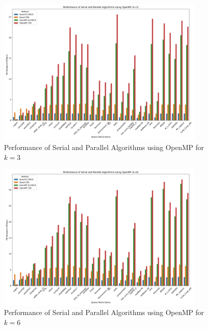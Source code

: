 \documentclass[12pt,oneside]{book} %
\begin{document}
\begin{figure}[H]
    \centering
    \includegraphics[width=0.9\textwidth]{../results/images/openMP_Performance_k3.png}
    \caption{Performance of Serial and Parallel Algorithms using OpenMP for $k=3$}
    \label{fig:openmp-performance-k3}
\end{figure}

\begin{figure}[H]
    \centering
    \includegraphics[width=0.9\textwidth]{../results/images/openMP_Performance_k6.png}
    \caption{Performance of Serial and Parallel Algorithms using OpenMP for $k=6$}
    \label{fig:openmp-performance-k6}
\end{figure}
\end{document}
